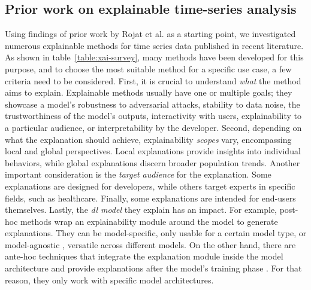 \subsection{Prior work on explainable time-series analysis}

Using findings of prior work by Rojat et al. \cite{rojat_explainable_2021} as a starting point, we investigated numerous explainable methods for time series data published in recent literature. As shown in table~\ref{table:xai-survey}, many methods have been developed for this purpose, and to choose the most suitable method for a specific use case, a few criteria need to be considered. First, it is crucial to understand \textit{what} the method aims to explain. Explainable methods usually have one or multiple goals; they showcase a model's robustness to adversarial attacks, stability to data noise, the trustworthiness of the model's outputs, interactivity with users, explainability to a particular audience, or interpretability by the developer. 
Second, depending on what the explanation should achieve, explainability \textit{scopes} vary, encompassing local and global perspectives. Local explanations provide insights into individual behaviors, while global explanations discern broader population trends. Another important consideration is the \textit{target audience} for the explanation. Some explanations are designed for developers, while others target experts in specific fields, such as healthcare. Finally, some explanations are intended for end-users themselves. 
 Lastly, the \textit{\gls{dl} model} they explain has an impact. For example, post-hoc methods wrap an explainability module around the model to generate explanations. They can be model-specific, only usable for a certain model type, or model-agnostic \cite{ribeiro_model-agnostic_2016}, versatile across different models. On the other hand, there are ante-hoc techniques that integrate the explanation module inside the model architecture and provide explanations after the model's training phase \cite{rojat_explainable_2021}. For that reason, they only work with specific model architectures. \\

